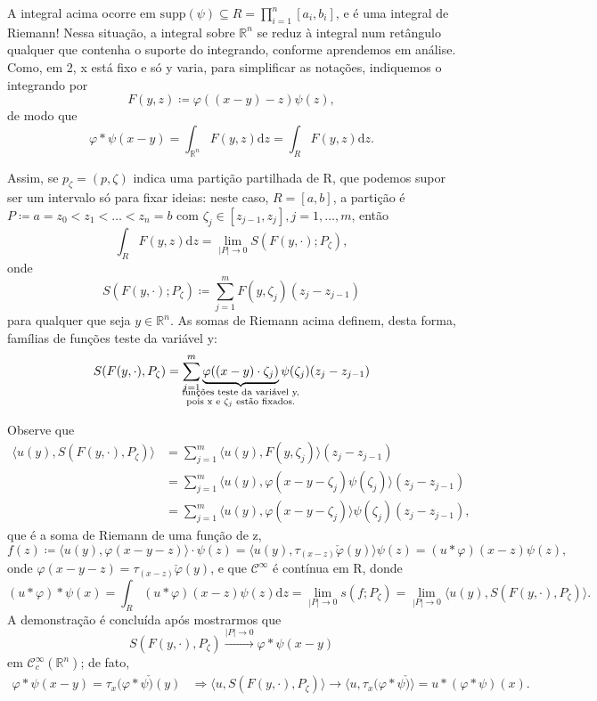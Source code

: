 \documentclass[../distribution_theory_notes.tex]{subfiles}
\begin{document}
\begin{proof*}
	A integral acima ocorre em \(\mathrm{supp}(\psi )\subseteq R = \prod\limits_{i=1}^{n}[a_{i}, b_{i}]\), e é uma integral de Riemann! Nessa situação, a integral sobre \(\mathbb{R}^{n}\) se reduz à integral num retângulo qualquer que contenha o suporte do integrando, conforme aprendemos em análise.
	Como, em 2, x está fixo e só y varia, para simplificar as notações, indiquemos o integrando por
	\[
		F(y, z) \coloneqq \varphi ((x-y)-z)\psi (z),
	\]
	de modo que
	\[
		\varphi *\psi (x-y) = \int_{\mathbb{R}^{n}}^{}F(y ,z) \mathrm{d}z = \int_{R}^{}F(y, z) \mathrm{d}z.
	\]

	Assim, se \(p_{\zeta } = (p, \zeta )\) indica uma partição partilhada de R, que podemos supor ser um intervalo só para fixar ideias: neste caso, \(R = [a, b]\), a partição é \(P\coloneqq a = z_{0} < z_1 < \dotsc < z_{n} = b\) com \(\zeta_{j}\in [z_{j-1}, z_{j}], j=1, \dotsc , m\), então
	\[
		\int_{R}^{}F(y, z) \mathrm{d}z = \lim_{| P |\to 0}S(F(y, \cdot ); P_{\zeta }),
	\]
	onde
	\[
		S(F(y, \cdot ); P_{\zeta })\coloneqq \sum\limits_{j=1}^{m}F(y, \zeta_{j})(z_{j}-z_{j-1})
	\]
	para qualquer que seja \(y\in \mathbb{R}^{n}\). As somas de Riemann acima definem, desta forma, famílias de funções teste da variável y:
	\[
		S(F(y, \cdot ), P_{\zeta }) = \sum\limits_{j=1}^{m}\underbrace{\varphi ((x-y)\cdot \zeta_{j})}_{\mathclap{\substack{\text{funções teste da variável y,} \\ \text{pois x e }\zeta_{j}\text{ estão fixados.}}}}\psi (\zeta_{j})(z_{j}-z_{j-1})
	\]

	Observe que
	\begin{align*}
		\langle u(y), S(F(y, \cdot ), P_{\zeta }) \rangle & = \sum\limits_{j=1}^{m} \langle u(y), F(y, \zeta_{j}) \rangle(z_{j}-z_{j-1})                        \\
		                                                  & = \sum\limits_{j=1}^{m}\langle u(y), \varphi(x-y-\zeta_{j})\psi(\zeta_{j}) \rangle(z_{j}-z_{j-1})   \\
		                                                  & = \sum\limits_{j=1}^{m}\langle u(y), \varphi(x-y-\zeta_{j}) \rangle \psi(\zeta_{j})(z_{j}-z_{j-1}),
	\end{align*}
	que é a soma de Riemann de uma função de z,
	\[
		f(z)\coloneqq \langle u(y), \varphi(x-y-z) \rangle \cdot \psi (z) = \langle u(y), \tau_{(x-z)}\check{\varphi }(y) \rangle\psi (z) = (u*\varphi )(x-z)\psi(z),
	\]
	onde \(\varphi(x-y-z) = \tau_{(x-z)}\check{\varphi }(y)\), e que \(\mathcal{C}^{\infty}\) é contínua em R, donde
	\[
		(u*\varphi )*\psi (x) = \int_{R}^{}(u*\varphi )(x-z)\psi (z) \mathrm{d}z = \lim_{| P |\to 0}s(f; P_{\zeta }) = \lim_{| P |\to 0}\langle u(y), S(F(y, \cdot ), P_{\zeta }) \rangle.
	\]
	A demonstração é concluída após mostrarmos que
	\[
		S(F(y, \cdot ), P_{\zeta })\stackrel{| P |\to 0}\longrightarrow \varphi *\psi (x-y)
	\]
	em \(\mathcal{C}_{c}^{\infty}(\mathbb{R}^{n})\); de fato,
	\begin{align*}
		\varphi *\psi (x-y) = \tau_{x}(\varphi *\psi \check{)}(y) & \Rightarrow \langle u, S(F(y, \cdot ), P_{\zeta }) \rangle\rightarrow \langle u, \tau_{x}(\varphi*\psi \check{)} \rangle= u * (\varphi *\psi )(x).
	\end{align*}

\end{proof*}
\end{document}

